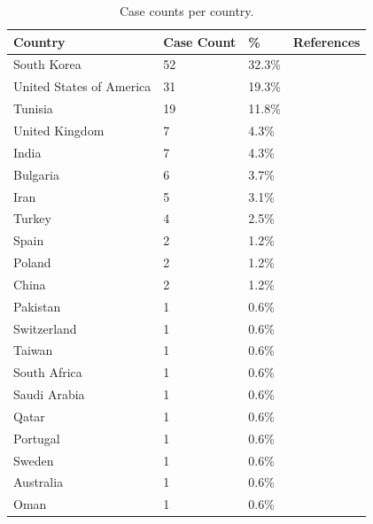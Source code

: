 
\begin{table}[h]
\caption{Case counts per country.}
\label{tab:case_country_counts}
\centering
\renewcommand{\arraystretch}{1.2}
\begin{tabular}{p{3cm} p{3cm} p{3cm} p{3cm}}
\toprule
\textbf{Country} & \textbf{Case Count} & \textbf{\%} & \textbf{References} \\
\midrule
South Korea & 52 & 32.3\% & \cite{Lee_2007} \\
United States of America & 31 & 19.3\% & \cite{Alao_2006i, Ataya_2013, Bhumi_2024f, Fry_2010, Guinan_2019f, Hardy_2023g, Jehangir_2019h, Karp_1991b, Kerestes_2019, Kumar_2001, Liu_2005, Tammana_2012j, Tay_2004} \\
Tunisia & 19 & 11.8\% & \cite{Elghali_2016} \\
United Kingdom & 7 & 4.3\% & \cite{Beecroft_1998, Berry_2021e, Cauchi_2002, Cox_2007, Gardner_2017h, Qureshi_2016} \\
India & 7 & 4.3\% & \cite{Bhasin_2014, Bhattacharjee_2008, Kar_2015, Kariholu_2008, Kumar_2019f, Misra_2013, Wadhwa_2015e} \\
Bulgaria & 6 & 3.7\% & \cite{Losanoff_1996, Losanoff_1997e} \\
Iran & 5 & 3.1\% & \cite{DivsalarP._2023a, Emamhadi_2018, Farhadi_2024h} \\
Turkey & 4 & 2.5\% & \cite{Akay_2015f, Atayan_2016, Tanrikulu_2015e, Yildiz_2016e} \\
Spain & 2 & 1.2\% & \cite{CamachoDorado_2018, fjbuilsRepeatedBehaviorDeliberate2024} \\
Poland & 2 & 1.2\% & \cite{Kobiela_2015, Wnęk_2015f} \\
China & 2 & 1.2\% & \cite{Jin_2023, Li_2013} \\
Pakistan & 1 & 0.6\% & \cite{Yasin_2009} \\
Switzerland & 1 & 0.6\% & \cite{Wildhaber_2005} \\
Taiwan & 1 & 0.6\% & \cite{Chang_2017f} \\
South Africa & 1 & 0.6\% & \cite{Sobnach_2011f} \\
Saudi Arabia & 1 & 0.6\% & \cite{Sultan_2024f} \\
Qatar & 1 & 0.6\% & \cite{Ali_2017} \\
Portugal & 1 & 0.6\% & \cite{Peixoto_2017f} \\
Sweden & 1 & 0.6\% & \cite{Naji_2012f} \\
Australia & 1 & 0.6\% & \cite{Apikotoa_2022f} \\
Oman & 1 & 0.6\% & \cite{AlShaaibi_2021b} \\

\end{tabular}
\end{table}
